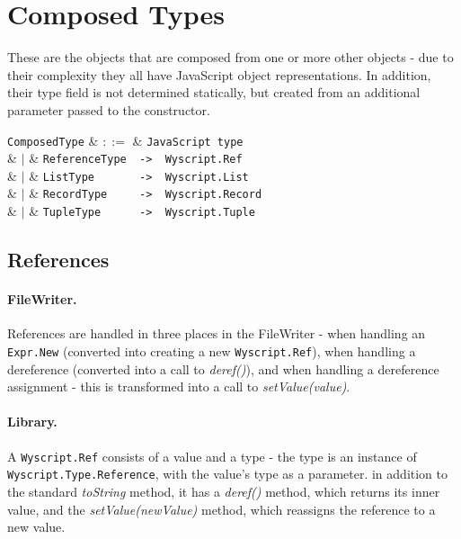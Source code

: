 
\section{Composed Types}
\label{c_types_composed_types}

These are the objects that are composed from one or more other objects - due to their complexity they all have JavaScript object representations. In addition, their type field is not determined statically, but created from an additional parameter passed to the constructor.

\begin{syntax}
  \verb+ComposedType+ & $::=$ & \verb+JavaScript type+\\
  & $|$ & \verb+ReferenceType  ->  Wyscript.Ref+\\
  & $|$ & \verb+ListType       ->  Wyscript.List+\\
  & $|$ & \verb+RecordType     ->  Wyscript.Record+\\
  & $|$ & \verb+TupleType      ->  Wyscript.Tuple+\\
\end{syntax}



\subsection{References}
\label{c_types_reference}

\paragraph{FileWriter.} References are handled in three places in the FileWriter - when handling an \lstinline{Expr.New} (converted into creating a new \lstinline{Wyscript.Ref}), when handling a dereference (converted into a call to {\em deref()}), and when handling a dereference assignment - this is transformed into a call to {\em setValue(value)}.

\paragraph{Library.} A \lstinline{Wyscript.Ref} consists of a value and a type - the type is an instance of \lstinline{Wyscript.Type.Reference}, with the value's type as a parameter. in addition to the standard {\em toString} method, it has a {\em deref()} method, which returns its inner value, and the {\em setValue(newValue)} method, which reassigns the reference to a new value.

